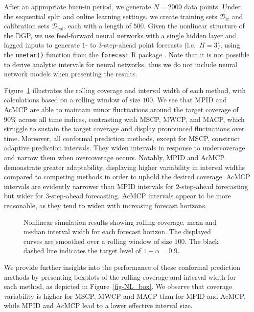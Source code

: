 \documentclass[
  11pt,
  a4paper,
]{article}
\theoremstyle{plain}
\theoremstyle{remark}
\begin{document}
After an appropriate burn-in period, we generate \(N=2000\) data points.
Under the sequential split and online learning settings, we create
training sets \(\mathcal{D}_{\text{tr}}\) and calibration sets
\(\mathcal{D}_{\text{cal}}\), each with a length of \(500\). Given the
nonlinear structure of the DGP, we use feed-forward neural networks with
a single hidden layer and lagged inputs to generate \(1\)- to
\(3\)-step-ahead point forecasts (i.e.~\(H=3\)), using the
\texttt{nnetar()} function from the \texttt{forecast} R package
\autocite{hyndman2024}. Note that it is not possible to derive analytic
intervals for neural networks, thus we do not include neural network
models when presenting the results.

Figure~\ref{fig-NL_cov} illustrates the rolling coverage and interval
width of each method, with calculations based on a rolling window of
size \(100\). We see that MPID and AcMCP are able to maintain minor
fluctuations around the target coverage of \(90\%\) across all time
indices, contrasting with MSCP, MWCP, and MACP, which struggle to
sustain the target coverage and display pronounced fluctuations over
time. Moreover, all conformal prediction methods, except for MSCP,
construct adaptive prediction intervals. They widen intervals in
response to undercoverage and narrow them when overcoverage occurs.
Notably, MPID and AcMCP demonstrate greater adaptability, displaying
higher variability in interval widths compared to competing methods in
order to uphold the desired coverage. AcMCP intervals are evidently
narrower than MPID intervals for \(2\)-step-ahead forecasting but wider
for \(3\)-step-ahead forecasting. AcMCP intervals appear to be more
reasonable, as they tend to widen with increasing forecast horizons.

\begin{figure}


\caption{\label{fig-NL_cov}Nonlinear simulation results showing rolling
coverage, mean and median interval width for each forecast horizon. The
displayed curves are smoothed over a rolling window of size \(100\). The
black dashed line indicates the target level of \(1-\alpha=0.9\).}

\end{figure}%

We provide further insights into the performance of these conformal
prediction methods by presenting boxplots of the rolling coverage and
interval width for each method, as depicted in Figure~\ref{fig-NL_box}.
We observe that coverage variability is higher for MSCP, MWCP and MACP
than for MPID and AcMCP, while MPID and AcMCP lead to a lower effective
interval size.
\end{document}
